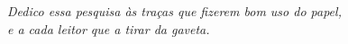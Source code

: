 \begin{dedicatoria}
   \vspace*{\fill}
   \centering
   \noindent
   \textit{ Dedico essa pesquisa às traças que fizerem bom uso do papel, \\
   e a cada leitor que a tirar da gaveta.}
   \vspace*{\fill}
\end{dedicatoria}
